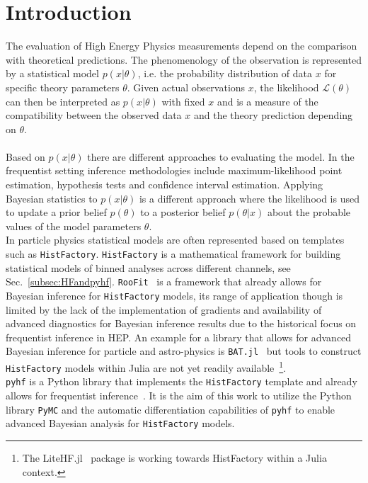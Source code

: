\section{Introduction}\label{sec:introduction}

The evaluation of High Energy Physics measurements depend on the comparison with theoretical predictions. The phenomenology of the observation is represented by a statistical model $p(x | \theta)$, i.e. the probability distribution of data $x$ for specific theory parameters $\theta$.
Given actual observations $x$, the likelihood $\mathcal{L}(\theta)$ can then be interpreted as $p(x | \theta)$ with fixed $x$ and is a measure of the compatibility between the observed data $x$ and the theory prediction depending on $\theta$.   \\ \\
Based on $p(x | \theta)$ there are different approaches to evaluating the model. In the frequentist setting inference methodologies include maximum-likelihood point estimation, hypothesis tests and confidence interval estimation. Applying Bayesian statistics to $p(x | \theta)$ is a different approach where the likelihood is used to update a prior belief $p(\theta)$ to a posterior belief $p(\theta|x)$ about the probable values of the model parameters $\theta$. \\
In particle physics statistical models are often represented based on templates such as \texttt{HistFactory}. \texttt{HistFactory} is a mathematical framework for building statistical models of binned analyses across different channels, see Sec.~\ref{subsec:HFandpyhf}. \texttt{RooFit}~\cite{root} is a framework that already allows for Bayesian inference for \texttt{HistFactory} models, its range of application though is limited by the lack of the implementation of gradients and availability of advanced diagnostics for Bayesian inference results due to the historical focus on frequentist inference in HEP. An example for a library that allows for advanced Bayesian inference for particle and astro-physics is \texttt{BAT.jl}~\cite{Schulz:2021BAT} but tools to construct \texttt{HistFactory} models within Julia are not yet readily available~\footnote{The LiteHF.jl~\cite{LiteHF} package is working towards HistFactory within a Julia context.}. \\
\texttt{pyhf} is a Python library that implements the \texttt{HistFactory} template and already allows for frequentist inference~\cite{pyhf, pyhf_joss}. It is the aim of this work to utilize the Python library \texttt{PyMC} and the automatic differentiation capabilities of \texttt{pyhf} to enable advanced Bayesian analysis for \texttt{HistFactory} models.
